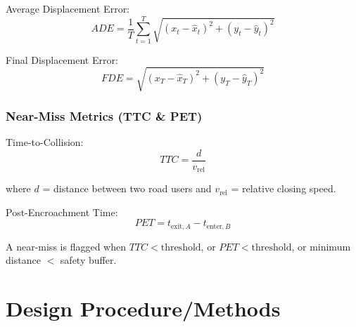 \documentclass[12pt,letterpaper]{article}
\begin{document}
Average Displacement Error:
\begin{equation}
ADE = \frac{1}{T} \sum_{t=1}^{T} \sqrt{(x_t - \hat{x}_t)^2 + (y_t - \hat{y}_t)^2}
\end{equation}

Final Displacement Error:
\begin{equation}
FDE = \sqrt{(x_T - \hat{x}_T)^2 + (y_T - \hat{y}_T)^2}
\end{equation}

\subsubsection{Near-Miss Metrics (TTC \& PET)}

Time-to-Collision:
\begin{equation}
TTC = \frac{d}{v_{\text{rel}}}
\end{equation}

where $d$ = distance between two road users and $v_{\text{rel}}$ = relative closing speed.

Post-Encroachment Time:
\begin{equation}
PET = t_{\text{exit},A} - t_{\text{enter},B}
\end{equation}

A near-miss is flagged when $TTC < \text{threshold}$, or $PET < \text{threshold}$, or minimum distance $<$ safety buffer.

\section{Design Procedure/Methods}
\end{document}
